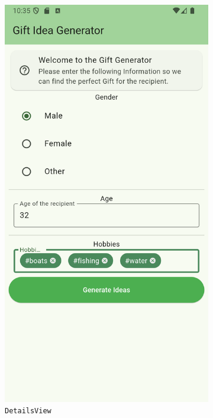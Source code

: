 \begin{figure}

	\begin{subfigure}{0.5\textwidth}
		\includegraphics[width=0.9\linewidth]{figures/screenshots/new_details_view_cropped.png}
		\caption{\texttt{DetailsView}}
	\end{subfigure}
	\begin{subfigure}{0.5\textwidth}

\end{subfigure}
\end{figure}
